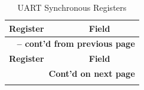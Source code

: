 \documentclass[main\_\_EN.tex]{subfiles}
\begin{document}
\begin{longtable}[c]{|p{6cm}|p{6cm}|}
\caption{UART Synchronous Registers}
\label{tab:uart-sync-reg} \\
    \hline
    \rowcolor{lightgray}
        \textbf{Register} & \textbf{Field} \\\hline
    \endfirsthead
        \multicolumn{2}{c}{\bfseries \tablename\ \thetable{} -- cont'd from previous page}\\\hline
        
    \rowcolor{lightgray}
        \textbf{Register} & \textbf{Field} \\\hline
    \endhead
        
        \multicolumn{2}{r}{\textbf{Cont'd on next page}} \\
    \endfoot
    \endlastfoot
    \hline
    

\end{longtable}
\end{document}

